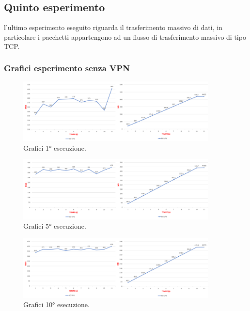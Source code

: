 \newpage
\subsection{Quinto esperimento}
l'ultimo esperimento eseguito riguarda il trasferimento massivo di dati, in particolare i pacchetti appartengono ad un flusso di trasferimento massivo di tipo TCP.

\subsubsection{Grafici esperimento senza VPN}

\begin{figure}[h] \includegraphics[width=0.9\textwidth] {Tesi magistrale/capitoli/images/53.png}
\centering
\caption{Grafici 1° esecuzione.}
\end{figure}

\begin{figure}[h] \includegraphics[width=0.9\textwidth] {Tesi magistrale/capitoli/images/54.png}
\centering
\caption{Grafici 5° esecuzione.}
\end{figure}

\begin{figure}[h] \includegraphics[width=0.9\textwidth] {Tesi magistrale/capitoli/images/55.png}
\centering
\caption{Grafici 10° esecuzione.}
\end{figure}

